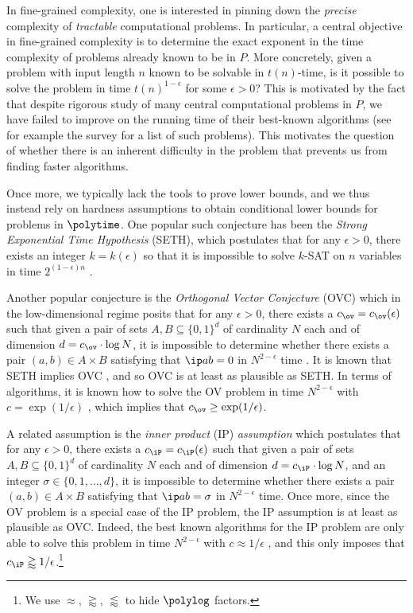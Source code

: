 \documentclass[11pt]{article}
\begin{document}
In fine-grained complexity, one is interested in pinning down the  \emph{precise} complexity
of \emph{tractable} computational problems. In particular, a central objective in fine-grained complexity is to 
determine the exact exponent  in the time complexity of
 problems already known to be in $P$. More concretely, given a problem with input length $n$ known
to be solvable in $t(n)$-time, is it possible to solve the problem 
in time $t(n)^{1-\epsilon}$  for some $\epsilon>0$?
 This is  motivated by the fact that despite rigorous study of many central
computational problems in $P$, we have failed to improve on the running time of their best-known algorithms (see for example the survey \cite{Wil18} for a list of such problems). This motivates the question of whether there is an inherent difficulty in the problem that prevents us from finding faster algorithms.

Once more, we typically lack the tools to prove lower bounds, and we  thus instead rely on hardness assumptions to obtain conditional lower bounds for problems in $\polytime$.
One popular such conjecture has been the \emph{Strong Exponential Time Hypothesis} (SETH), which postulates that for any $\epsilon>0$, there exists an integer $k=k(\epsilon)$ so that
it is impossible to solve $k$-SAT on $n$ variables  in time  $2^{(1-\epsilon)n}$ \cite{IP01}.

Another popular conjecture is the \emph{Orthogonal Vector Conjecture} (OVC) which in the low-dimensional regime posits that for any $\epsilon>0$, there exists a $c_{\ov}= c_{\ov}(\epsilon)$ such that given a pair of sets $A,B\subseteq\{0,1\}^{d}$ of cardinality $N$ each and of dimension $d = c_{\ov} \cdot \log N$,  it is impossible to determine whether there exists a pair $(a,b)\in A\times B$
satisfying that $\ip a b=0$ in $N^{2-\epsilon}$ time \cite{GIKW19}. It is known that  SETH implies OVC \cite{Wil05}, and so OVC is at least as plausible as SETH. In terms of algorithms, it is known how to solve the OV problem in time $N^{2-\epsilon}$ with $c = \exp(1/\epsilon)$ \cite{AWY15, CW21}, which implies that $c_{\ov} \geq \exp(1/\epsilon)$.

A related assumption is the \emph{inner product} (IP) \emph{assumption} which postulates that for any $\epsilon>0$, there exists a $c_{\iP}= c_{\iP}(\epsilon)$ such that given a pair of sets $A,B\subseteq\{0,1\}^{d}$ of cardinality $N$ each and of dimension $d = c_{\iP} \cdot \log N$, and an integer $\sigma \in \{0,1,\ldots,d\}$,  it is impossible to determine whether there exists a pair $(a,b)\in A\times B$
satisfying that $\ip a b=\sigma$ in $N^{2-\epsilon}$ time. Once more, since the OV problem is a special case of the IP problem, the IP assumption is at least as plausible as OVC. Indeed, the best known algorithms for the IP problem are only able to solve this problem in time $N^{2-\epsilon}$ with $c \approx 1/\epsilon$ \cite{AW15}, and this only imposes that $c_{\iP} \gtrapprox  1/\epsilon$.\footnote{We use $\approx$, $\gtrapprox$, $\lessapprox$ to hide $\polylog$ factors.} 
 
\end{document}
